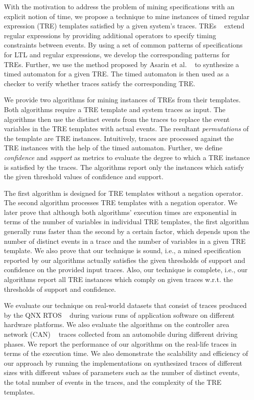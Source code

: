 \documentclass[]{sigplanconf}
\begin{document}
With the motivation to address the problem of mining specifications with an explicit notion of time, we propose a technique to mine instances of timed regular expression (TRE) templates satisfied by a given system's traces. TREs ~\cite{timedregex} extend regular expressions by providing additional operators to specify timing constraints between events. By using a set of common patterns of specifications for LTL and regular expressions, we develop the corresponding patterns for TREs. Further, we use the method proposed by Asarin et al. ~\cite{timedregex} to synthesize a timed automaton for a given TRE. The timed automaton is then used as a checker to verify whether traces satisfy the corresponding TRE.

We provide two algorithms for mining instances of TREs from their templates. Both algorithms require a TRE template and system traces as input. The algorithms then use the distinct events from the traces to replace the event variables in the TRE templates with actual events. The resultant \emph{permutations} of the template are TRE instances.
Intuitively, traces are processed against the TRE instances with the help of the timed automaton. Further, we define  \emph{confidence} and \emph{support} as metrics to evaluate the degree to which a TRE instance is satisfied by the traces. The algorithms report only the instances which satisfy the given threshold values of confidence and support.

The first algorithm is designed for TRE templates without a negation operator. The second algorithm processes TRE templates with a negation operator.
We later prove that although both algorithms' execution times are exponential in terms of the number of variables in individual TRE templates, the first algorithm generally runs faster than the second by a certain factor, which depends upon the number of distinct events in a trace and the number of variables in a given TRE template. We also prove that our technique is sound, i.e., a mined specification reported by our algorithms actually satisfies the given thresholds of support and confidence on the provided input traces. Also, our technique is complete, i.e., our algorithms report all TRE instances which comply on given traces w.r.t. the thresholds of support and confidence.

We evaluate our technique on real-world datasets that consist of traces produced by the QNX RTOS ~\cite{QNX_RTOS} during various runs of application software on different hardware platforms. We also evaluate the algorithms on the controller area network (CAN) ~\cite{Davis2007} traces collected from an automobile during different driving phases. We report the performance of our algorithms on the real-life traces in terms of the execution time. We also demonstrate the scalability and efficiency of our approach by running the implementations on synthesized traces of different sizes with different values of parameters such as the number of distinct events, the total number of events in the traces, and the complexity of the TRE templates.
\end{document}
